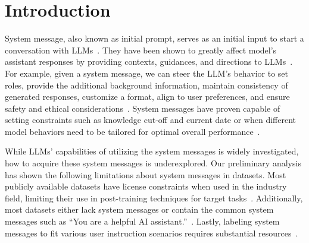 \section{Introduction}



System message, also known as initial prompt, serves as an initial input to start a conversation with LLMs~\citep{openai2024function, cohere2024,  prompthub2025}.
They have been shown to greatly affect model's assistant responses by providing contexts, guidances, and directions to LLMs~\citep{qin2024sysbench, lee2024aligning}.
For example, given a system message, we can steer the LLM's behavior to set roles, provide the additional background information, maintain consistency of generated responses, customize a format, align to user preferences, and ensure safety and ethical considerations~\cite{alkhamissi2024investigating, yang2024qwen2, dubey2024llama}.
System messages have proven capable of setting constraints such as knowledge cut-off and current  date or when different model behaviors need to be tailored for optimal overall performance~\citep{lin2024baichuan, abdin2024phi}.


While LLMs' capabilities of utilizing the system messages is widely investigated, how to acquire these system messages is underexplored.
Our preliminary analysis has shown the following limitations about system messages in datasets.
Most publicly available datasets have license constraints when used in the industry field, limiting their use in post-training techniques for target tasks~\citep{xie2020unsupervised, ouyang2022training, zhou2023instruction, cui2023ultrafeedback}. 
Additionally, most datasets either lack system messages or contain the common system messages such as ``You are a helpful AI assistant.''~\citep{xu2023parameter, pareja2024unveiling}.
Lastly, labeling system messages to fit various user instruction scenarios requires substantial resources~\citep{abdin2024phi, qin2024sysbench, lee2024aligning}.


